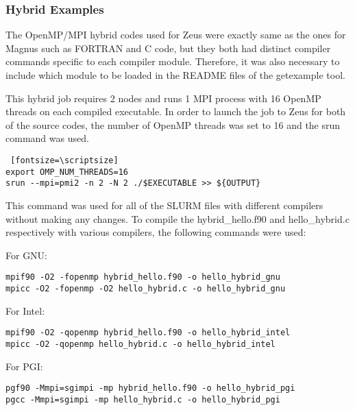 \subsubsection{Hybrid Examples}

The OpenMP/MPI hybrid codes used for Zeus were exactly same as the ones for Magnus such as FORTRAN and C code, but they both had
distinct compiler commands specific to each compiler module. Therefore, it was also necessary to include which module to be loaded in the README files
of the getexample tool.

This hybrid job requires 2 nodes and runs 1 MPI process with 16 OpenMP threads on each compiled executable. In order to launch the job to Zeus for both 
of the source codes, the number of OpenMP threads was set to 16 and the srun command was used.

\begin{tcolorbox}
\begin{Verbatim} [fontsize=\scriptsize]
export OMP_NUM_THREADS=16
srun --mpi=pmi2 -n 2 -N 2 ./$EXECUTABLE >> ${OUTPUT}
\end{Verbatim}
\end{tcolorbox}

This command was used for all of the SLURM files with different compilers without making any changes. To compile the hybrid\_hello.f90 and 
hello\_hybrid.c respectively with various compilers, the following commands were used:

For GNU:

\begin{tcolorbox}
\begin{Verbatim}[fontsize=\scriptsize]
mpif90 -O2 -fopenmp hybrid_hello.f90 -o hello_hybrid_gnu
mpicc -O2 -fopenmp -O2 hello_hybrid.c -o hello_hybrid_gnu
\end{Verbatim}
\end{tcolorbox}


For Intel:

\begin{tcolorbox}
\begin{Verbatim}[fontsize=\scriptsize]
mpif90 -O2 -qopenmp hybrid_hello.f90 -o hello_hybrid_intel
mpicc -O2 -qopenmp hello_hybrid.c -o hello_hybrid_intel
\end{Verbatim}
\end{tcolorbox}

For PGI:

\begin{tcolorbox}
\begin{Verbatim}[fontsize=\scriptsize]
pgf90 -Mmpi=sgimpi -mp hybrid_hello.f90 -o hello_hybrid_pgi
pgcc -Mmpi=sgimpi -mp hello_hybrid.c -o hello_hybrid_pgi
\end{Verbatim}
\end{tcolorbox}
